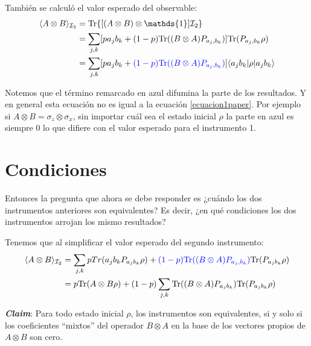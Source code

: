 \documentclass[12pt,oneside]{book}\raggedbottom{}
\begin{document}
También se calculó el valor esperado del observable:
\[\begin{split}
	\la A\otimes B \ra_{\mathcal{I}_2}&=\tr\{[(A\otimes B) \otimes \mathds{1}]\mathcal{I}_2\} \\
	&=\sum_{j,k}[p a_{j}b_k +(1-p)\tr( (B\otimes A)P_{a_j,b_k}) ]\tr(P_{a_j,b_k} \rho)\\
	&=\sum_{j,k}[p a_{j}b_k +{\color{blue}(1-p)\tr( (B\otimes A)P_{a_j,b_k})} ]\la a_j b_k|\rho |a_j b_k\ra \\
\end{split}\]

		Notemos que el término remarcado en azul difumina la parte de los resultados. Y en general esta ecuación no es igual a la ecuación {\ref{ecuacion1paper}}. Por ejemplo si $A\otimes B= \sigma_z\otimes \sigma_x$, sin importar cuál sea el estado inicial $\rho$ la parte en azul es siempre 0 lo que difiere con el valor esperado para el instrumento 1. 

\section{Condiciones}
Entonces la pregunta que ahora se debe responder es ¿cuándo los dos instrumentos anteriores son equivalentes? Es decir, ¿en qué condiciones los dos instrumentos arrojan los mismo resultados?

Tenemos que al simplificar el valor esperado del segundo instrumento:
\begin{equation*}\begin{split}\langle A\otimes B \rangle_{\mathcal{I}_2}&=\sum_{j,k} p Tr(a_{j}b_k P_{a_j b_k}\rho)+{\color{blue}(1-p){\rm Tr}( (B\otimes A)P_{a_j,b_k})} {\rm Tr}(P_{a_j b_k}\rho) \\
    &=p{\rm Tr}(A\otimes B \rho)+(1-p)\sum_{j,k}{\rm Tr}((B\otimes A )P_{a_j b_k} ){\rm Tr}(P_{a_j b_k}\rho)
\end{split}\end{equation*}


\textbf{\textit{Claim}}: Para todo estado inicial $\rho$, los instrumentos son equivalentes, si y solo si los coeficientes ``mixtos'' del operador $B\otimes A$ en la base de los vectores propios de $A\otimes B$ son cero.
\end{document}
